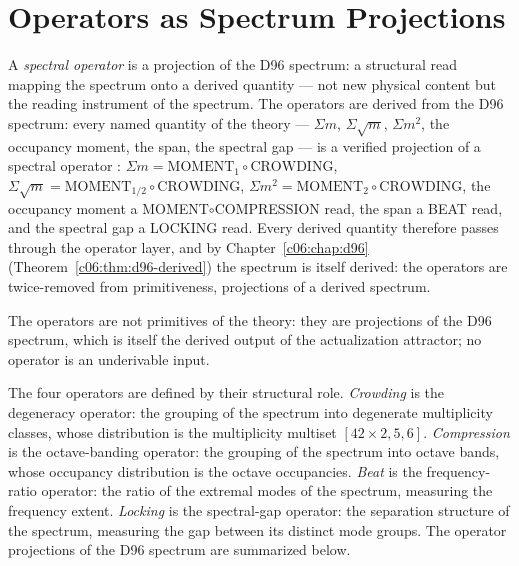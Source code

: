 \section{Operators as Spectrum Projections}
\label{c07:sec:projections}

\begin{theorem}
\label{c07:thm:operators-derived}
A \emph{spectral operator} is a projection of the D96 spectrum: a structural read mapping
the spectrum onto a derived quantity --- not new physical content but the reading instrument
of the spectrum. The operators are derived from the D96 spectrum: every named quantity of
the theory --- $\Sigma m$, $\Sigma\sqrt{m}$, $\Sigma m^2$, the occupancy moment, the span,
the spectral gap --- is a verified projection of a spectral operator \cite{c07:QG261}:
$\Sigma m = \mathrm{MOMENT}_1\circ\mathrm{CROWDING}$, $\Sigma\sqrt{m} =
\mathrm{MOMENT}_{1/2}\circ\mathrm{CROWDING}$, $\Sigma m^2 =
\mathrm{MOMENT}_2\circ\mathrm{CROWDING}$, the occupancy moment a MOMENT$\circ$COMPRESSION
read, the span a BEAT read, and the spectral gap a LOCKING read. Every derived quantity
therefore passes through the operator layer, and by Chapter~\ref{c06:chap:d96}
(Theorem~\ref{c06:thm:d96-derived}) the spectrum is itself derived: the operators are
twice-removed from primitiveness, projections of a derived spectrum.
\end{theorem}

\begin{corollary}
\label{c07:cor:operators-not-primitive}
The operators are not primitives of the theory: they are projections of the D96 spectrum,
which is itself the derived output of the actualization attractor; no operator is an
underivable input.
\end{corollary}

The four operators are defined by their structural role. \emph{Crowding} is the degeneracy
operator: the grouping of the spectrum into degenerate multiplicity classes, whose
distribution is the multiplicity multiset $[42\times2,5,6]$. \emph{Compression} is the
octave-banding operator: the grouping of the spectrum into octave bands, whose occupancy
distribution is the octave occupancies. \emph{Beat} is the frequency-ratio operator: the
ratio of the extremal modes of the spectrum, measuring the frequency extent. \emph{Locking}
is the spectral-gap operator: the separation structure of the spectrum, measuring the gap
between its distinct mode groups. The operator projections of the D96 spectrum
\cite{c07:QG261} are summarized below.

